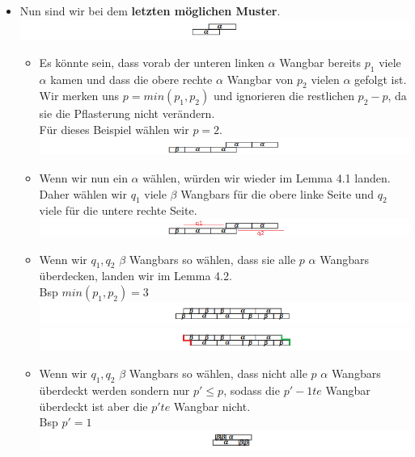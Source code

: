 \begin{itemize}
    
    \item Nun sind wir bei dem \textbf{letzten möglichen Muster}.
    \\ \includegraphics[width=\textwidth]{src/pics/9.png}
    \begin{itemize}
        \item Es könnte sein, dass vorab der unteren linken $\alpha$ Wangbar bereits $p_1$ viele $\alpha$ kamen und dass die obere rechte $\alpha$ Wangbar von $p_2$ vielen $\alpha$ gefolgt ist. 
        \\Wir merken uns $p = min(p_1,p_2)$ und ignorieren die restlichen $p_2 - p$, da sie die Pflasterung nicht verändern. 
        \\Für dieses Beispiel wählen wir $p=2$.
        \\ \includegraphics[width=\textwidth]{src/pics/10.png}
        \item Wenn wir nun ein $\alpha$ wählen, würden wir wieder im Lemma 4.1 landen. Daher wählen wir $q_1$ viele $\beta$ Wangbars für die obere linke Seite und $q_2$ viele für die untere rechte Seite.
        \\ \includegraphics[width=\textwidth]{src/pics/11.png}
        
        \item Wenn wir $q_1, q_2$ $\beta$ Wangbars so wählen, dass sie alle $p$ $\alpha$ Wangbars überdecken, landen wir im Lemma 4.2.
        \\ Bsp $min(p_1,p_2) = 3$
        \\ \includegraphics[width=\textwidth]{src/pics/12.png}
        \\ \includegraphics[width=\textwidth]{src/pics/12_2.png}
        
        \item Wenn wir $q_1, q_2$ $\beta$ Wangbars so wählen, dass nicht alle $p$ $\alpha$ Wangbars überdeckt werden sondern nur $p'\leq p$, sodass die $p'-1te$ Wangbar überdeckt ist aber die $p'te$ Wangbar nicht. 
        \\Bsp $p' = 1$
        \\ \includegraphics[width=\textwidth]{src/pics/13.png}
        

\end{itemize}
\end{itemize}
